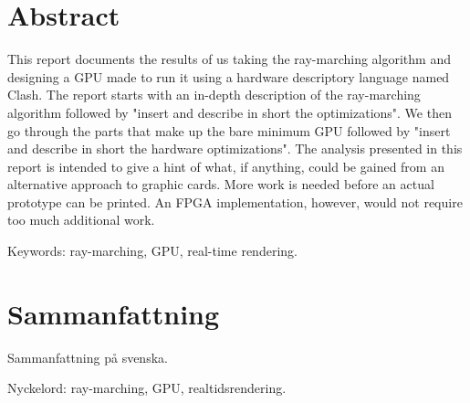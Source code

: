 \thispagestyle{plain}			%
\setlength{\parskip}{0pt plus 1.0pt}
\section*{Abstract}

	This report documents the results of us taking the ray-marching algorithm
	and designing a GPU made to run it using a hardware descriptory language
	named Clash.\cite{Raa2015a} The report starts with an in-depth description
	of the ray-marching algorithm followed by "insert and describe in short the
	optimizations". We then go through the parts that make up the bare minimum
	GPU followed by "insert and describe in short the hardware optimizations".
	The analysis presented in this report is intended to give a hint of what,
	if anything, could be gained from an alternative approach to graphic cards.
	More work is needed before an actual prototype can be printed. An FPGA
	implementation, however, would not require too much additional work.

	\vfill
	Keywords: ray-marching, GPU, real-time rendering.

\newpage
\thispagestyle{plain}

\section*{Sammanfattning}
	
	Sammanfattning på svenska.
	
	\vfill
	Nyckelord: ray-marching, GPU, realtidsrendering.


\newpage
\thispagestyle{empty}
\mbox{}
